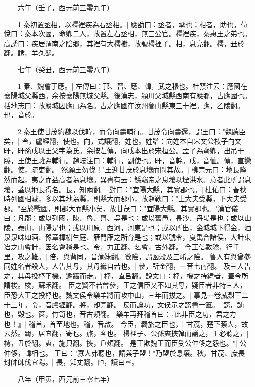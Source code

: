 　　六年（壬子，西元前三零九年）

　　1 秦初置丞相，以樗裡疾為右丞相。|{
	應劭曰：丞者，承也；相者，助也。荀悅曰：秦本次國，命卿二人，故置左右丞相，無三公官。樗裡疾，秦惠王之弟也。高誘曰：疾居渭南之陰鄉，其裡有大樗樹，故號樗裡子。相，息亮翻。樗，丑於翻。誘，羊久翻。
	}

　　七年（癸丑，西元前三零八年）

　　1 秦、魏會于應。|{
	左傳曰：邘、晉、應、韓，武之穆也。杜預注云：應國在襄陽城父縣西。余按襄陽無城父縣。後漢志，潁川父城縣西南有應鄉，古應國也。括地志曰：故應城因應山為名。古之應國在汝州魯山縣東三十裡。應，乙陵翻。邘，音於。
	}

　　2 秦王使甘茂約魏以伐韓，而令向壽輔行。甘茂令向壽還，謂王曰："魏聽臣矣，|{
	令，盧經翻，使也。向，式讓翻，姓也。姓譜：向姓本自宋文公枝子向文旰，旰孫戌以王父字為氏。余按左傳，向戌本出於宋桓公。孟子為齊卿，出吊于滕，王使王驩為輔行。趙岐注曰：輔行，副使也。旰，音幹。戌，音恤。傳，直戀翻。使，疏吏翻。
	}
然願王勿伐！"王迎甘茂於息壤而問其故。|{
	柳宗元曰：地長隆然而起，夷之而益高者為息壤。異書有云：鯀竊帝之息壤以堙洪水。意者此所謂息壤，蓋以地長得名。長，知兩翻。
	}
對曰："宜陽大縣，其實郡也。|{
	杜佑曰：春秋時列國相滅，多以其地為縣，則縣大而郡小，故趙鞅曰："上大夫受縣，下大夫受郡。"至於戰國，則郡大而縣小矣，故甘茂曰："宜陽大縣。其實郡也。"漢官儀曰：凡郡：或以列國，陳、魯、齊、吳是也；或以舊邑，長沙、丹陽是也；或以山陵，泰山，山陽是也；或以川原，西河，河東是也；或以所出，金城城下得金，酒泉泉味如酒、豫章樟樹生庭、雁門雁之所育是也；或以號令，夏禹合諸侯，大計東冶之山會計，因名會稽是也。令，力正翻。名會，古外翻。
	}
今王倍數險，行千里，攻之難。|{
	倍，與背同，音蒲妹翻。數險，謂函穀及三崤之險。
	}
魯人有與曾參同姓名者殺人，人告其母，其母織自若也。|{
	參，所金翻，一音七南翻。
	}
及三人告之，其母投杼下機，逾牆而走。|{
	杼，直呂翻。說文曰：杼，機之持緯者，蓋今所謂梭。梭，蘇禾翻。
	}
臣之賢不若曾參，王之信臣又不如其母，疑臣者非特三人，臣恐大王之投杼也。魏文侯令樂羊將而攻中山，三年而拔之。|{
	事見一卷威烈王二十三年。令，音盧經翻。將，卽亮翻。
	}
反而論功，文侯示之謗書一篋。|{
	謗，訕也，毀也。篋，竹笥也，音古頰翻。
	}
樂羊再拜稽首曰：『此非臣之功，君之力也！』|{
	稽首，首至地也。稽，音啟。
	}
今臣，羇旅之臣也，|{
	甘茂，楚下蔡人，故云然。羇，居宜翻，寄也。旅，客也。
	}
樗裡子、公孫奭挾韓而議之，王必聽之，|{
	樗，丑於翻。奭，施只翻。挾，戶頰翻。
	}
是王欺魏王而臣受公仲侈之怨也。"|{
	公仲侈，韓相也。
	}
王曰："寡人弗聽也，請與子盟！"乃盟於息壤。秋，甘茂、庶長封帥師伐宜陽。|{
	長，知丈翻。帥，讀曰率。
	}

　　八年（甲寅，西元前三零七年）

